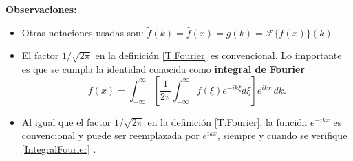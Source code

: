 \textbf{Observaciones:}
\begin{itemize}
    \item Otras notaciones usadas son: $\tilde{f}(k) = \hat{f}(x) = g(k) = \mathcal{F}\{f(x)\}(k)$.
    
    \item El factor $1/\sqrt{2\pi}$ en la definición \eqref{T.Fourier} es convencional. Lo importante es que se cumpla la identidad conocida como \textbf{integral de Fourier}
    \begin{equation}
        f(x) = \int_{-\infty}^{\infty} \left[\frac{1}{2\pi} \int_{-\infty}^{\infty} f(\xi) e^{-ik\xi} d\xi \right] e^{ikx} \,dk.
      \label{IntegralFourier}
    \end{equation}
   

    \item Al igual que el factor $1/\sqrt{2\pi}$ en la definición \eqref{T.Fourier}, la función $e^{-ikx}$ es convencional y puede ser reemplazada por $e^{ikx}$, siempre y cuando se verifique \eqref{IntegralFourier} \cite{Butkov, Riley}.
    

    
    
    

\end{itemize}
